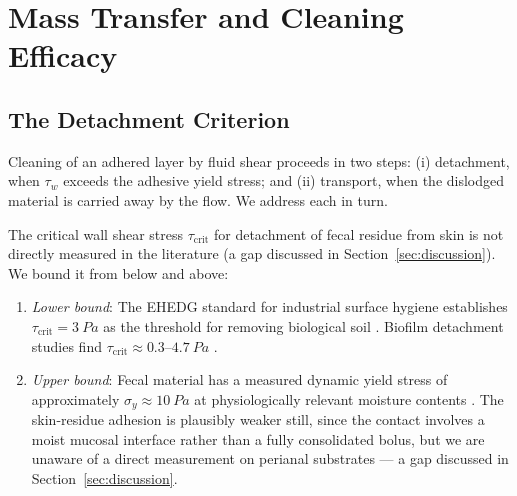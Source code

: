 \documentclass[10pt,letterpaper]{article}
\begin{document}
\section{Mass Transfer and Cleaning Efficacy}
\label{sec:mass}

\subsection{The Detachment Criterion}
\label{subsec:detach}

Cleaning of an adhered layer by fluid shear proceeds in two steps:
(i) detachment, when $\tau_w$ exceeds the adhesive yield stress; and
(ii) transport, when the dislodged material is carried away by the flow.
We address each in turn.

The critical wall shear stress $\tau_\mathrm{crit}$ for detachment of
fecal residue from skin is not directly measured in the literature (a gap
discussed in Section~\ref{sec:discussion}). We bound it from below and
above:

\begin{enumerate}[leftmargin=*, label=(\roman*)]
    \item \emph{Lower bound}: The EHEDG standard for industrial surface
    hygiene establishes $\tau_\mathrm{crit} = 3~Pa$ as the threshold
    for removing biological soil \citep{Ehedg2003}. Biofilm detachment
    studies find $\tau_\mathrm{crit} \approx 0.3$--$4.7~Pa$
    \citep{Teodosio2010}.
    \item \emph{Upper bound}: Fecal material has a measured dynamic yield
    stress of approximately $\sigma_y \approx 10~Pa$ at physiologically
    relevant moisture contents \citep{Woolley2014}. The skin-residue
    adhesion is plausibly weaker still, since the contact involves a
    moist mucosal interface rather than a fully consolidated bolus, but
    we are unaware of a direct measurement on perianal substrates ---
    a gap discussed in Section~\ref{sec:discussion}.
\end{enumerate}
\end{document}
